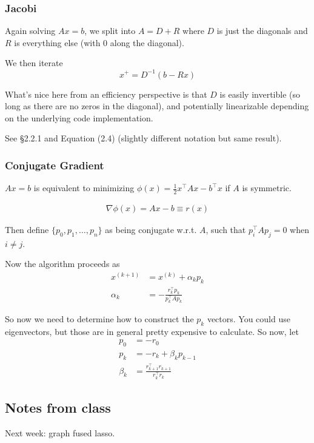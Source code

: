 \documentclass{article}
\begin{document}
\subsubsection{Jacobi}
Again solving $Ax=b$, we split into $A=D+R$ where $D$ is just the diagonals and $R$ is everything else (with 0 along the diagonal).

We then iterate
$$x^+ = D^{-1} (b-Rx)$$

What's nice here from an efficiency perspective is that $D$ is easily invertible (so long as there are no zeros in the diagonal), and potentially linearizable depending on the underlying code implementation.

See \cite{barrett1994templates} \S2.2.1 and Equation (2.4) (slightly different notation but same result).


\subsubsection{Conjugate Gradient}
$Ax=b$ is equivalent to minimizing $\phi(x)=\frac{1}{2}x^\top A x -b^\top x$ if $A$ is symmetric.

\begin{align*}
\nabla \phi(x) = Ax-b \equiv r(x)
\end{align*}

Then define $\{ p_0, p_1, \ldots, p_n\}$ as being conjugate w.r.t. $A$, such that
$p_i^\top A p_j = 0$ when $i\neq j$.

Now the algorithm proceeds as
\begin{align*}
x^{(k+1)} &= x^{(k)} + \alpha_k p_k\\
\alpha_k &= -\frac{r_k^\top p_k}{p_k^\top A p_k}
\end{align*}

So now we need to determine how to construct the $p_k$ vectors. You could use eigenvectors, but those
are in general pretty expensive to calculate. So now, let
\begin{align*}
p_0 &= -r_0\\
p_k &= -r_k + \beta_k p_{k-1}\\
\beta_k &= \frac{r_{k+1}^\top r_{k+1}}{r_k^\top r_k}
\end{align*}



\subsection{Notes from class}
Next week: graph fused lasso.
\end{document}
